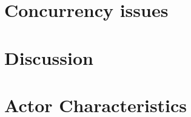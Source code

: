 





\section{Concurrency issues}\label{sec:actor_con_issues}

\section{Discussion}\label{sec:actor_discussion}




\section{Actor Characteristics}\label{sec:actor_charac}

\worksheetend
